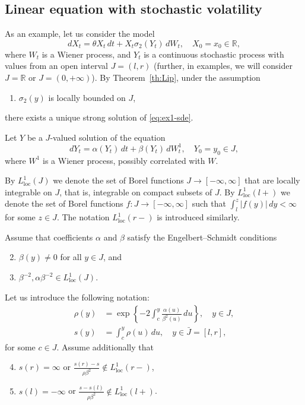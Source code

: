 \documentclass[numbers,compress,v1.0.1]{vmsta}
\theoremstyle{remark}
\newcommand{\R}{\mathbb R}
\newcommand*{\abs}[1]{\left\lvert#1\right\rvert}
\newcommand*{\set}[1]{\left\{#1\right\}}
\newcommand{\lloc}{L^1_{\mathrm{loc}}}
\begin{document}
\subsection{Linear equation with stochastic volatility}
As an example, let us consider the model
%
\begin{equation}
\label{eq:ex1-sde} dX_t =\theta X_t\,dt + X_t
\sigma_2(Y_t)\,dW_t, \quad
X_0=x_0\in\R,
\end{equation}
%
where $W_t$ is a Wiener process, and $Y_t$ is a continuous stochastic
process with values from an open interval $J=(l,r)$ (further, in
examples, we will consider $J=\R$ or $J=(0,+\infty)$).
By Theorem~\ref{th:Lip}, under the assumption
%
\begin{enumerate}[({A}1)]
%
\item\label{A0} $\sigma_2(y)$ is locally bounded on $J$,
\end{enumerate}
%
there exists a unique strong solution of \eqref{eq:ex1-sde}.\vadjust{\eject}

Let $Y$ be a $J$-valued solution of the equation
%
\begin{equation}
\label{eq:ex1-Y} dY_t =\alpha(Y_t)\,dt +
\beta(Y_t)\,dW_t^1, \quad Y_0=y_0
\in J,
\end{equation}
%
where $W^1$ is a Wiener process, possibly correlated with $W$.

By $\lloc(J)$ we denote the set of Borel functions $J\to[-\infty,\infty
]$ that are locally integrable on $J$, that is, integrable on compact
subsets of $J$.
By $\lloc(l+)$ we denote the set of Borel functions
$f\colon J\to[-\infty,\infty]$ such that
$\int_l^z\abs{f(y)}\,dy<\infty$
for some $z\in J$.
The notation $\lloc(r-)$ is introduced similarly.

Assume that coefficients $\alpha$ and $\beta$ satisfy the
Engelbert--Schmidt conditions
%
\begin{enumerate}[({A}1)]
\setcounter{enumi}{1}
%
\item\label{A1} $\beta(y)\ne0$ for all $y\in J$, and
%
\item\label{A2} $\beta^{-2},\alpha\beta^{-2}\in\lloc(J)$.
\end{enumerate}

Let us introduce the following notation:
%
\begin{align*}
\rho(y)&=\exp\set{-2\int_c^y\frac{\alpha(u)}{\beta^2(u)}
\,du}, \quad y\in J,
\\
s(y)&=\int_c^y\rho(u)\,du, \quad y\in\bar
J=[l,r],
\end{align*}
%
for some $c\in J$.
Assume additionally that
%
\begin{enumerate}[({A}1)]
\setcounter{enumi}{3}
%
\item\label{A3} $s(r)=\infty$ or $\frac{s(r)-s}{\rho\beta^2}\notin\lloc(r-)$,
%
\item\label{A4} $s(l)=-\infty$ or $\frac{s-s(l)}{\rho\beta^2}\notin\lloc(l+)$.
\end{enumerate}
\end{document}
